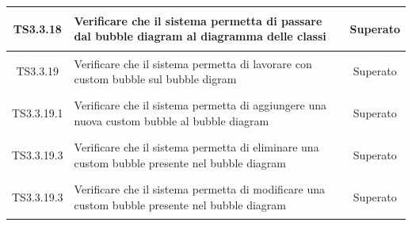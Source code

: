 \documentclass[../PianoDiQualifica.tex]{subfiles}
\begin{document}
\begin{longtable}{|c|>{\centering}p{10cm}|c|}
	\hline
	\hypertarget{TS3.3.18}{TS3.3.18} & Verificare che il sistema permetta di passare dal bubble diagram al diagramma delle classi & Superato \\
	\hline
	\hypertarget{TS3.3.19}{TS3.3.19} & Verificare che il sistema permetta di lavorare con custom bubble sul bubble digram & Superato \\
	\hline
	\hypertarget{TS3.3.19.1}{TS3.3.19.1} & Verificare che il sistema permetta di aggiungere una nuova custom bubble al bubble diagram & Superato \\
	\hline
	\hypertarget{TS3.3.19.3}{TS3.3.19.3} & Verificare che il sistema permetta di eliminare una custom bubble presente nel bubble diagram &Superato \\
	\hline
	\hypertarget{TS3.3.19.3}{TS3.3.19.3} & Verificare che il sistema permetta di modificare una custom bubble presente nel bubble diagram &Superato \\
	

\end{longtable}
\end{document}
